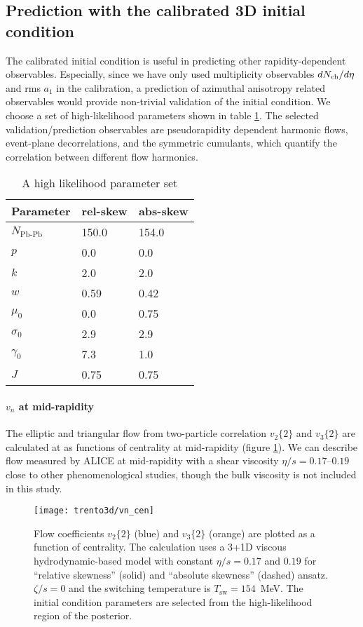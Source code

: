 \subsection{Prediction with the calibrated 3D initial condition}
The calibrated initial condition is useful in predicting other rapidity-dependent observables.
Especially, since we have only used multiplicity observables $dN_\text{ch}/d\eta$ and rms $a_1$ in the calibration, a prediction of azimuthal anisotropy related observables would provide non-trivial validation of the initial condition.
We choose a set of high-likelihood parameters shown in table \ref{tab:chosen_parameters}.
The selected validation/prediction observables are pseudorapidity dependent harmonic flows, event-plane decorrelations, and the symmetric cumulants, which quantify the correlation between different flow harmonics.

\begin{table}
\centering
\caption{A high likelihood parameter set}
\begin{tabular}{lll}
\hline
Parameter & rel-skew	& abs-skew \\
\hline
$N_{\textrm{Pb-Pb}}$   & 150.0     & 154.0  \\
$p$	    & 0.0      & 0.0  \\
$k$	    & 2.0     & 2.0  \\
$w$	    & 0.59     & 0.42  \\
$\mu_0$   & 0.0     & 0.75  \\
$\sigma_0$ & 2.9    & 2.9  \\
$\gamma_0$ & 7.3		& 1.0	\\
$J$	     & 0.75 & 0.75	\\
\hline
\end{tabular}
\label{tab:chosen_parameters}    
\end{table}

\paragraph{$v_n$ at mid-rapidity} The elliptic and triangular flow from two-particle correlation $v_2\{2\}$ and $v_3\{2\}$ are calculated at as functions of centrality at mid-rapidity (figure \ref{fig:trento:vn_cen}).
We can describe flow measured by ALICE \cite{Adam:2016izf} at mid-rapidity with a shear viscosity $\eta/s = 0.17$--$0.19$ close to other phenomenological studies, though the bulk viscosity is not included in this study.

\begin{figure}
\singlespacing 
\centering
\texttt{[image: trento3d/vn\_cen]}
\caption[Flow coefficients $v_2\{2\}$ (blue) and $v_3\{2\}$ (orange) are plotted as]{Flow coefficients $v_2\{2\}$ (blue) and $v_3\{2\}$ (orange) are plotted as a function of centrality. The calculation uses a 3+1D viscous hydrodynamic-based model with constant $\eta/s=0.17$ and $0.19$ for ``relative skewness'' (solid) and ``absolute skewness'' (dashed) ansatz. $\zeta/s=0$ and the switching temperature is $T_\text{sw}=154$~MeV.
The initial condition parameters are selected from the high-likelihood region of the posterior.}
\label{fig:trento:vn_cen}
\end{figure}

